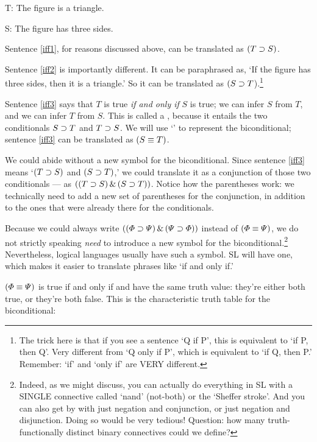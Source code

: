 \begin{ekey}
\item[T:] The figure is a triangle.
\item[S:] The figure has three sides.
\end{ekey}

Sentence \ref{iff1}, for reasons discussed above, can be translated as $(T\supset S)$.

Sentence \ref{iff2} is importantly different. It can be paraphrased as, `If the figure has three sides, then it is a triangle.' So it can be translated as $(S\supset T$).\footnote{{\color{black}The trick here is that if you see a sentence `Q if P', this is equivalent to `if P, then Q'. Very different from `Q only if P', which is equivalent to `if Q, then P.' Remember: `if' and `only if' are VERY different.}}

Sentence \ref{iff3} says that $T$ is true \emph{if and only if} $S$ is true; we can infer $S$ from $T$, and we can infer $T$ from $S$. This is called a , because it entails the two conditionals $S\supset T$ and $T \supset S$. We will use `\eiff' to represent the biconditional; sentence \ref{iff3} can be translated as $(S \equiv T)$.

We could abide without a new symbol for the biconditional. Since sentence \ref{iff3} means `$(T \supset S)$ and $(S\supset T)$,' we could translate it as a conjunction of those two conditionals --- as $((T \supset S)\,\&\,(S\supset T))$. Notice how the parentheses work: we technically need to add a new set of parentheses for the conjunction, in addition to the ones that were already there for the conditionals.

Because we could always write $((\varPhi{}\supset\varPsi{})\,\&\,(\varPsi{}\supset\varPhi{}))$ instead of $(\varPhi{}\equiv\varPsi{})$, we do not strictly speaking \emph{need} to introduce a new symbol for the biconditional.\footnote{{\color{black}Indeed, as we might discuss, you can actually do everything in SL with a SINGLE connective called `nand' (not-both) or the `Sheffer stroke'. And you can also get by with just negation and conjunction, or just negation and disjunction. Doing so would be very tedious! Question: how many truth-functionally distinct binary connectives could we define?}} Nevertheless, logical languages usually have such a symbol. SL will have one, which makes it easier to translate phrases like `if and only if.'

$(\varPhi{}\equiv\varPsi{})$ is true if and only if \metaA{} and \metaB{} have the same truth value: they're either both true, or they're both false. This is the characteristic truth table for the biconditional:

